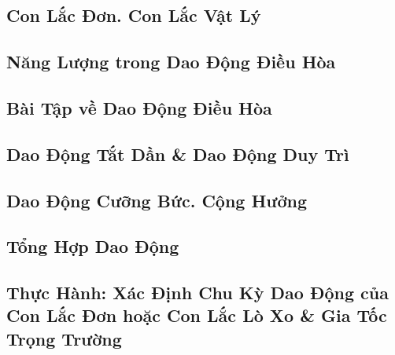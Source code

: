 \documentclass{article}
\numberwithin{equation}{section}
\begin{document}

\subsection{Con Lắc Đơn. Con Lắc Vật Lý}


\subsection{Năng Lượng trong Dao Động Điều Hòa}


\subsection{Bài Tập về Dao Động Điều Hòa}


\subsection{Dao Động Tắt Dần \& Dao Động Duy Trì}


\subsection{Dao Động Cưỡng Bức. Cộng Hưởng}


\subsection{Tổng Hợp Dao Động}


\subsection{Thực Hành: Xác Định Chu Kỳ Dao Động của Con Lắc Đơn hoặc Con Lắc Lò Xo \& Gia Tốc Trọng Trường}
\end{document}

